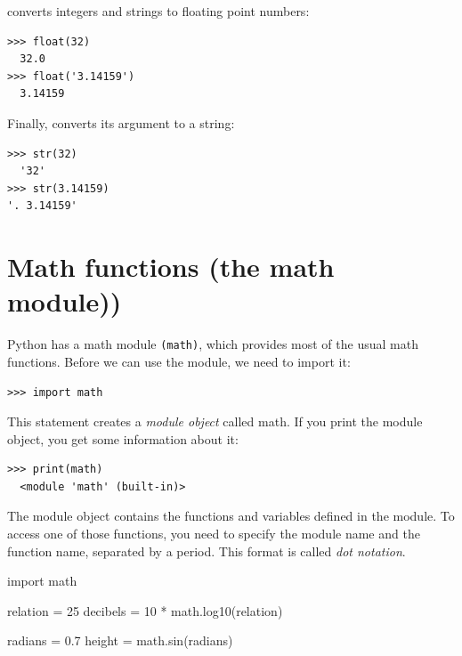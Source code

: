  converts integers and strings to floating point numbers:

 

\begin{Verbatim}[frame=single]
>>> float(32)
  32.0
>>> float('3.14159')
  3.14159
\end{Verbatim}

Finally,  converts its argument to a string:

 

\begin{Verbatim}[frame=single]
>>> str(32)
  '32'
>>> str(3.14159)
'. 3.14159'
\end{Verbatim}

\hypertarget{funciones-matemuxe1ticas}{%
\section{Math functions (the math module))}\label{funciones-matemuxe1ticas}}

  

Python has a math module \texttt{(math)}, which provides most of the usual math functions. Before we can use the module, we need to import it:

\begin{Verbatim}[frame=single]
>>> import math
\end{Verbatim}

This statement creates a \emph{module object} called math. If you print the module object, you get some information about it:

\begin{Verbatim}[frame=single]
>>> print(math)
  <module 'math' (built-in)>
\end{Verbatim}

The module object contains the functions and variables defined in the module. To access one of those functions, you need to specify the module name and the function name, separated by a period. This format is called \emph{dot notation}.


\begin{python}[frame=single]
import math

relation = 25
decibels = 10 * math.log10(relation)

radians = 0.7
height = math.sin(radians)
\end{python}

